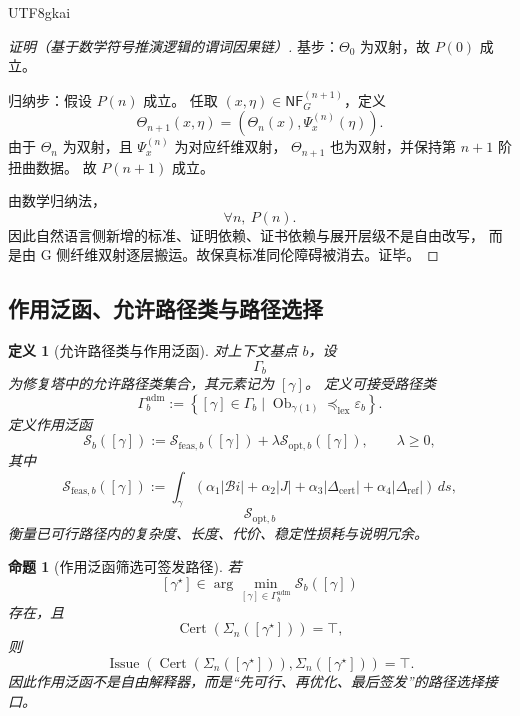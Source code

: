 \documentclass[12pt]{article}
\newtheorem{definition}{定义}[section]
\newtheorem{proposition}{命题}[section]
\newcommand{\Cert}{\operatorname{Cert}}
\newcommand{\Issue}{\operatorname{Issue}}
\begin{document}
\begin{CJK*}{UTF8}{gkai}
\begin{proof}[证明（基于数学符号推演逻辑的谓词因果链）]
基步：\(\Theta_0\) 为双射，故 \(P(0)\) 成立。

归纳步：假设 \(P(n)\) 成立。
任取 \((x,\eta)\in\mathsf{NF}_G^{(n+1)}\)，定义
\[
  \Theta_{n+1}(x,\eta)
  =
  (\Theta_n(x),\Psi_x^{(n)}(\eta)).
\]
由于 \(\Theta_n\) 为双射，且 \(\Psi_x^{(n)}\) 为对应纤维双射，
\(\Theta_{n+1}\) 也为双射，并保持第 \(n+1\) 阶扭曲数据。
故 \(P(n+1)\) 成立。

由数学归纳法，
\[
  \forall n,\ P(n).
\]
因此自然语言侧新增的标准、证明依赖、证书依赖与展开层级不是自由改写，
而是由 G 侧纤维双射逐层搬运。故保真标准同伦障碍被消去。证毕。
\end{proof}

\subsection{作用泛函、允许路径类与路径选择}
\label{subsec:tex51-g-action-functional}

\begin{definition}[允许路径类与作用泛函]
对上下文基点 \(b\)，设
\[
  \Gamma_b
\]
为修复塔中的允许路径类集合，其元素记为 \([\gamma]\)。
定义可接受路径类
\[
  \Gamma_b^{\mathrm{adm}}
  :=
  \left\{
    [\gamma]\in\Gamma_b
    \mid
    \operatorname{Ob}_{\gamma(1)}
    \preceq_{\mathrm{lex}}
    \varepsilon_b
  \right\}.
\]
定义作用泛函
\[
  \mathcal S_b([\gamma])
  :=
  \mathcal S_{\mathrm{feas},b}([\gamma])
  +
  \lambda\mathcal S_{\mathrm{opt},b}([\gamma]),
  \qquad
  \lambda\ge0,
\]
其中
\[
  \mathcal S_{\mathrm{feas},b}([\gamma])
  :=
  \int_\gamma
  \left(
    \alpha_1|\mathcal B\!i|
    +
    \alpha_2|J|
    +
    \alpha_3|\Delta_{\mathrm{cert}}|
    +
    \alpha_4|\Delta_{\mathrm{ref}}|
  \right)\,ds,
\]
\[
  \mathcal S_{\mathrm{opt},b}
\]
衡量已可行路径内的复杂度、长度、代价、稳定性损耗与说明冗余。
\end{definition}

\begin{proposition}[作用泛函筛选可签发路径]
\label{prop:tex51-g-action-selects-path}
若
\[
  [\gamma^\star]\in
  \arg\min_{[\gamma]\in\Gamma_b^{\mathrm{adm}}}
  \mathcal S_b([\gamma])
\]
存在，且
\[
  \Cert(\Sigma_n([\gamma^\star]))=\top,
\]
则
\[
  \Issue(\Cert(\Sigma_n([\gamma^\star])),\Sigma_n([\gamma^\star]))=\top.
\]
因此作用泛函不是自由解释器，而是“先可行、再优化、最后签发”的路径选择接口。
\end{proposition}


\end{CJK*}
\end{document}
